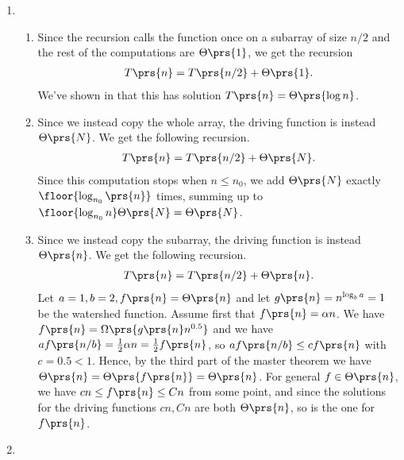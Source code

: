 \documentclass[oneside]{scrbook}
\theoremstyle{definition}
\begin{document}
\begin{problem}
\begin{enumerate}[label=\alph*.]
\item %

\begin{enumerate}[label=\arabic*.]
\item %
Since the recursion calls the function once on a subarray of size $n/2$ and the rest of the computations are $\Theta\prs{1}$, we get the recursion
\begin{align*}
T\prs{n} = T\prs{n/2} + \Theta\prs{1} \text{.}
\end{align*}
We've shown in  that this has solution $T\prs{n} = \Theta\prs{\log n}$.
\item %
Since we instead copy the whole array, the driving function is instead $\Theta\prs{N}$. We get the following recursion.
\begin{align*}
T\prs{n} = T\prs{n/2} + \Theta\prs{N} \text{.}
\end{align*}
Since this computation stops when $n \leq n_0$, we add $\Theta\prs{N}$ exactly $\floor{\log_{n_0}\prs{n}}$ times, summing up to $\floor{\log_{n_0} n} \Theta\prs{N} = \Theta\prs{N}$.
\item %
Since we instead copy the subarray, the driving function is instead $\Theta\prs{n}$. We get the following recursion.
\begin{align*}
T\prs{n} = T\prs{n/2} + \Theta\prs{n} \text{.}
\end{align*}
Let $a = 1, b = 2, f\prs{n} = \Theta\prs{n}$ and let $g\prs{n} = n^{\log_b a} = 1$ be the watershed function. Assume first that $f\prs{n} = \alpha n$. We have $f\prs{n} = \Omega\prs{g\prs{n} n^{0.5}}$ and we have $a f\prs{n/b} = \frac{1}{2} \alpha n = \frac{1}{2} f\prs{n}$, so $a f\prs{n/b} \leq c f\prs{n}$ with $c = 0.5 < 1$. Hence, by the third part of the master theorem we have $\Theta\prs{n} = \Theta\prs{f\prs{n}} = \Theta\prs{n}$.
For general $f \in \Theta\prs{n}$, we have $c n \leq f\prs{n} \leq C n$ from some point, and since the solutions for the driving functions $cn, Cn$ are both $\Theta\prs{n}$, so is the one for $f\prs{n}$.
\end{enumerate}

\item %


\end{enumerate}
\end{problem}
\end{document}
